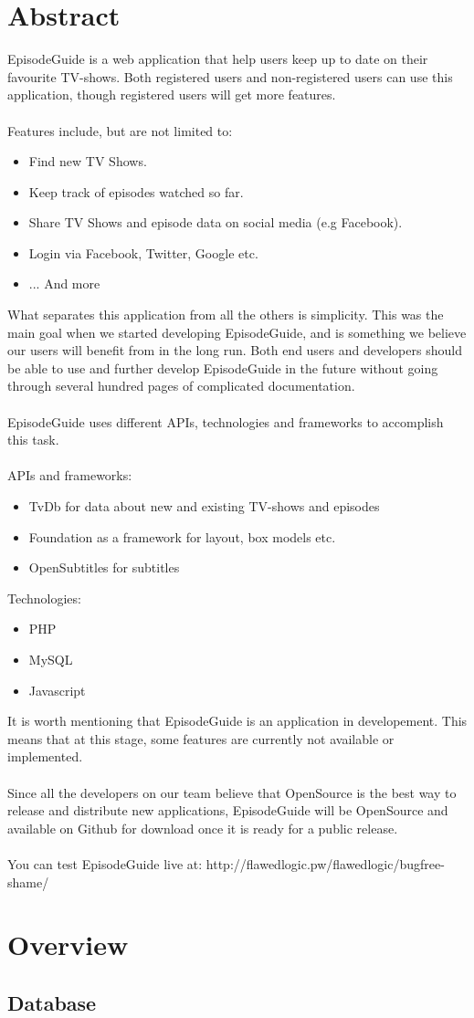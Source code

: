 \documentclass[12pt]{article}
\begin{document}


\tableofcontents

\section{Abstract}
EpisodeGuide is a web application that help users keep up to date on their favourite TV-shows. Both registered users and non-registered users can use this application, though registered users will get more features.
\\\\
Features include, but are not limited to:
\begin{itemize}
  \item Find new TV Shows.
  \item Keep track of episodes watched so far.
  \item Share TV Shows and episode data on social media (e.g Facebook).
  \item Login via Facebook, Twitter, Google etc.
  \item ... And more
\end{itemize}
What separates this application from all the others is simplicity. This was the main goal when we started developing EpisodeGuide, and is something we believe our users will benefit from in the long run.
Both end users and developers should be able to use and further develop EpisodeGuide in the future without going through several hundred pages of complicated documentation.
\\\\
EpisodeGuide uses different APIs, technologies and frameworks to accomplish this task.\\\\
APIs and frameworks:
\begin{itemize}
  \item TvDb for data about new and existing TV-shows and episodes
  \item Foundation as a framework for layout, box models etc.
  \item OpenSubtitles for subtitles
\end{itemize}
Technologies:
\begin{itemize}
  \item PHP
  \item MySQL
  \item Javascript
\end{itemize}
It is worth mentioning that EpisodeGuide is an application in developement. This means that at this stage, some features are currently not available or implemented.\\
\\
Since all the developers on our team believe that OpenSource is the best way to release and distribute new applications, EpisodeGuide will be OpenSource and available on Github for download once it is ready for a public release.
\\
\\
You can test EpisodeGuide live at: http://flawedlogic.pw/flawedlogic/bugfree-shame/
\section{Overview}
\subsection{Database}



\end{document}
